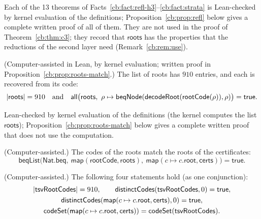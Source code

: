 Each of the 13 theorems of Facts~\ref{cb:fact:refl-h3}--\ref{cb:fact:strata} is Lean-checked by kernel evaluation of
the definitions; Proposition~\ref{cb:prop:refl} below gives a complete written proof of all of them. They are not used
in the proof of Theorem~\ref{cb:thm:c3}; they record that $\mathsf{roots}$ has the properties that the reductions of
the second layer need (Remark~\ref{cb:rem:use}).

\begin{fact}\label{cb:fact:roots-match}
(Computer-assisted in Lean, by kernel evaluation; written proof in Proposition~\ref{cb:prop:roots-match}.)
The list of roots has $910$ entries, and each is recovered from its code:
\[
\card{\mathsf{roots}}=910\quad\text{and}\quad
\mathsf{all}\big(\mathsf{roots},\ \rho\mapsto\mathsf{beqNode}(\mathsf{decodeRoot}(\mathsf{rootCode}(\rho)),\rho)\big)
=\mathsf{true}.
\]
\end{fact}

Lean-checked by kernel evaluation of the definitions (the kernel computes the list $\mathsf{roots}$);
Proposition~\ref{cb:prop:roots-match} below gives a complete written proof that does not use the computation.

\begin{fact}\label{cb:fact:roots-codes}
(Computer-assisted.) The codes of the roots match the roots of the certificates:
\[
\mathsf{beqList}\big(\mathsf{Nat.beq},\ \mathsf{map}(\mathsf{rootCode},\mathsf{roots}),\
\mathsf{map}(c\mapsto c.\mathsf{root},\mathsf{certs})\big)=\mathsf{true}.
\]
\end{fact}

\begin{fact}\label{cb:fact:roots-tsv}
(Computer-assisted.) The following four statements hold (as one conjunction):
\begin{gather*}
\lvert\mathsf{tsvRootCodes}\rvert=910,\qquad \mathsf{distinctCodes}(\mathsf{tsvRootCodes},0)=\mathsf{true},\\
\mathsf{distinctCodes}(\mathsf{map}(c\mapsto c.\mathsf{root},\mathsf{certs}),0)=\mathsf{true},\\
\mathsf{codeSet}(\mathsf{map}(c\mapsto c.\mathsf{root},\mathsf{certs}))=\mathsf{codeSet}(\mathsf{tsvRootCodes}).
\end{gather*}
\end{fact}

